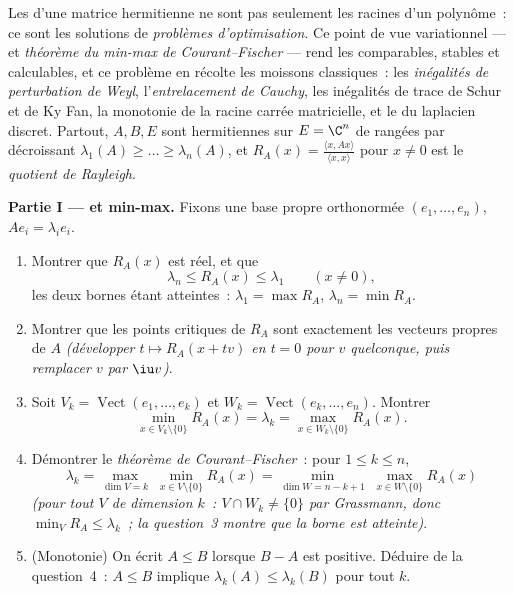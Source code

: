 \begin{problem}\label{pb:b2:hermitian:1}
Les  d'une matrice hermitienne ne sont pas seulement
les racines d'un polynôme~: ce sont les solutions de \emph{problèmes
d'optimisation}. Ce point de vue variationnel ---  et \emph{théorème du min-max de
Courant--Fischer} --- rend les
 comparables, stables et calculables, et ce problème en
récolte les moissons classiques~: les \emph{inégalités de perturbation
de Weyl}, l'\emph{entrelacement de Cauchy},
les inégalités de trace de Schur et de Ky Fan, la monotonie de la
racine carrée matricielle, et le  du laplacien discret.
Partout, $A, B, E$ sont hermitiennes sur $E = \C^n$ de 
rangées par  décroissant $\lambda_1(A) \geq \dots \geq
\lambda_n(A)$, et $R_A(x) = \frac{\langle x, Ax\rangle}{\langle x,
x\rangle}$ pour $x \neq 0$ est le \emph{quotient de
Rayleigh}.

\medskip
\noindent\textbf{Partie I ---  et min-max.}
Fixons une base propre orthonormée $(e_1, \dots, e_n)$, $Ae_i =
\lambda_ie_i$.
\begin{enumerate}
  \item Montrer que $R_A(x)$ est réel, et que
        \[
        \lambda_n \leq R_A(x) \leq \lambda_1
        \qquad (x \neq 0),
        \]
        les deux bornes étant atteintes~: $\lambda_1 = \max R_A$,
        $\lambda_n = \min R_A$.
  \item Montrer que les points critiques de $R_A$ sont exactement les
        vecteurs propres de $A$ \emph{(développer $t \mapsto R_A(x +
        tv)$ en $t = 0$ pour $v$ quelconque, puis remplacer $v$ par
        $\iu v$)}.
  \item Soit $V_k = \operatorname{Vect}(e_1, \dots, e_k)$ et
        $W_k = \operatorname{Vect}(e_k, \dots, e_n)$. Montrer
        \[
        \min_{x \in V_k\setminus\{0\}} R_A(x) = \lambda_k
        = \max_{x \in W_k\setminus\{0\}} R_A(x) .
        \]
  \item Démontrer le \emph{théorème de Courant--Fischer}~: pour $1 \leq
        k \leq n$,
        \[
        \lambda_k = \max_{\dim V = k}\;\min_{x \in
        V\setminus\{0\}} R_A(x)
        = \min_{\dim W = n-k+1}\;\max_{x \in
        W\setminus\{0\}} R_A(x)
        \]
        \emph{(pour tout $V$ de dimension $k$~: $V \cap W_k \neq
        \{0\}$ par Grassmann, donc $\min_V R_A \leq \lambda_k$~;
        la question~3 montre que la borne est atteinte)}.
  \item (Monotonie) On écrit $A \leq B$ lorsque $B - A$ est
        positive. Déduire de la question~4~: $A \leq
        B$ implique $\lambda_k(A) \leq \lambda_k(B)$ pour tout
        $k$.
\end{enumerate}


\end{problem}
